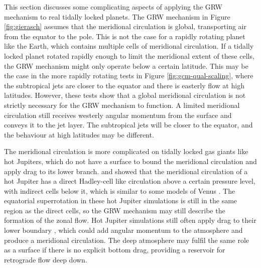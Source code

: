 This section discusses some complicating aspects of applying the GRW mechanism to real tidally locked planets. The GRW mechanism in Figure \ref{fig:gierasch} assumes that the meridional circulation is global, transporting air from the equator to the pole. This is not the case for a rapidly rotating planet like the Earth, which contains multiple cells of meridional circulation. If a tidally locked planet rotated rapidly enough to limit the meridional extent of these cells, the GRW mechanism might only operate below a certain latitude. This may be the case in the more rapidly rotating tests in Figure \ref{fig:gcm-qual-scaling}, where the subtropical jets are closer to the equator and there is easterly flow at high latitudes. However, these tests show that a global meridional circulation is not strictly necessary for the GRW mechanism to function. A limited meridional circulation still receives westerly angular momentum from the surface and conveys it to the jet layer. The subtropical jets will be closer to the equator, and the behaviour at high latitudes may be different.

The meridional circulation is more complicated on tidally locked gas giants like hot Jupiters, which do not have a surface to bound the meridional circulation and apply drag to its lower branch. \citet{heng2011atmospheric} and \citet{mendoncca2018revisiting} showed that the meridional circulation of a hot Jupiter has a direct Hadley-cell like circulation above a certain pressure level, with indirect cells below it, which is similar to some models of Venus \citep{sugimoto2019fully}. The equatorial superrotation in these hot Jupiter simulations is still in the same region as the direct cells, so the GRW mechanism may still describe the formation of the zonal flow. Hot Jupiter simulations still often apply drag to their lower boundary \citep{liu2013atmospheric}, which could add angular momentum to the atmosphere and produce a meridional circulation. The deep atmosphere may fulfil the same role as a surface if there is no explicit bottom drag, providing a reservoir for retrograde flow deep down.

